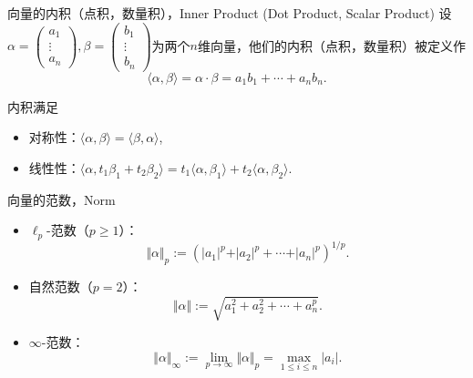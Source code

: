 \documentclass[10pt]{beamer}
\begin{document}
\begin{frame}

\begin{block}{向量的内积（点积，数量积），Inner Product (Dot Product, Scalar Product)}
设\(\displaystyle \alpha = \begin{pmatrix} a_1 \\ \vdots \\ a_n \end{pmatrix}, \beta = \begin{pmatrix} b_1 \\ \vdots \\ b_n \end{pmatrix}\)为两个$n$维向量，他们的内积（点积，数量积）被定义作
$$\langle \alpha, \beta \rangle = \alpha\cdot\beta = a_1b_1 + \cdots + a_nb_n.$$

\pause

内积满足
\begin{itemize}
\item 对称性：$\langle \alpha, \beta \rangle = \langle \beta, \alpha \rangle$,
\item 线性性：$\langle \alpha, t_1\beta_1 + t_2\beta_2 \rangle = t_1\langle \alpha, \beta_1 \rangle +  t_2\langle \alpha, \beta_2 \rangle$.
\end{itemize}
\end{block}

\end{frame}


\begin{frame}

\begin{block}{向量的范数，Norm}
\begin{itemize}
\item<1-> $\ell_p$-范数（$p\geqslant 1$）：
$$\Vert \alpha \Vert_p := \left( \vert a_1 \vert^p + \vert a_2 \vert^p + \cdots + \vert a_n \vert^p \right)^{1/p}.$$
\item<2-> 自然范数（$p = 2$）：
$$\Vert \alpha \Vert := \sqrt{a_1^2 + a_2^2 + \cdots + a_n^p}.$$
\item<3-> $\infty$-范数：
$$\Vert \alpha \Vert_{\infty} := \lim\limits_{p\to\infty} \Vert \alpha \Vert_p = \max_{1\leqslant i \leqslant n} \vert a_i \vert.$$
\end{itemize}
\end{block}

\end{frame}

\end{document}
